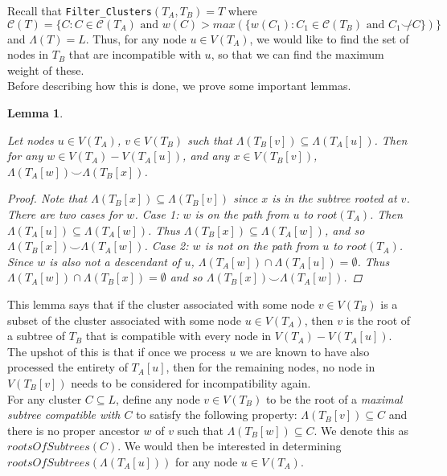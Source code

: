 \documentclass{article}
\newcommand{\compatible}{\smile}
\newcommand{\leafset}{\Lambda}
\newtheorem{filterclusterssubsetcompatible}[incompatibility]{Lemma}
\begin{document}
    Recall that \texttt{Filter\_Clusters}$(T_A, T_B) = T$ where $\mathcal{C}(T) = \{C : C \in \mathcal{C}(T_A) \text{ and } w(C) > max(\{w(C_1) : C_1 \in \mathcal{C}(T_B) \text{ and } C_1 \not\compatible C\})\}$ and $\leafset(T) = L$. Thus, for any node $u \in V(T_A)$, we would like to find the set of nodes in $T_B$ that are incompatible with $u$, so that we can find the maximum weight of these.\\

    Before describing how this is done, we prove some important lemmas.

    \begin{filterclusterssubsetcompatible}
        \label{lem:filterclusterssubsetcompatible}

        Let nodes $u \in V(T_A)$, $v \in V(T_B)$ such that $\leafset(T_B[v]) \subseteq \leafset(T_A[u])$. Then for any $w \in V(T_A) - V(T_A[u])$, and any $x \in V(T_B[v])$, $\leafset(T_A[w]) \compatible \leafset(T_B[x])$.

        \begin{proof}
            Note that $\leafset(T_B[x]) \subseteq \leafset(T_B[v])$ since $x$ is in the subtree rooted at $v$. There are two cases for $w$. Case 1: $w$ is on the path from $u$ to $root(T_A)$. Then $\leafset(T_A[u]) \subseteq \leafset(T_A[w])$. Thus $\leafset(T_B[x]) \subseteq \leafset(T_A[w])$, and so $\leafset(T_B[x]) \compatible \leafset(T_A[w])$. Case 2: $w$ is not on the path from $u$ to $root(T_A)$. Since $w$ is also not a descendant of $u$, $\leafset(T_A[w]) \cap \leafset(T_A[u]) = \emptyset$. Thus $\leafset(T_A[w]) \cap \leafset(T_B[x]) = \emptyset$ and so $\leafset(T_B[x]) \compatible \leafset(T_A[w])$.
        \end{proof}
    \end{filterclusterssubsetcompatible}

    This lemma says that if the cluster associated with some node $v \in V(T_B)$ is a subset of the cluster associated with some node $u \in V(T_A)$, then $v$ is the root of a subtree of $T_B$ that is compatible with every node in $V(T_A) - V(T_A[u])$. The upshot of this is that if once we process $u$ we are known to have also processed the entirety of $T_A[u]$, then for the remaining nodes, no node in $V(T_B[v])$ needs to be considered for incompatibility again.\\

    For any cluster $C \subseteq L$, define any node $v \in V(T_B)$ to be the root of a \textit{maximal subtree compatible with $C$} to satisfy the following property: $\leafset(T_B[v]) \subseteq C$ and there is no proper ancestor $w$ of $v$ such that $\leafset(T_B[w]) \subseteq C$. We denote this as $rootsOfSubtrees(C)$. We would then be interested in determining $rootsOfSubtrees(\leafset(T_A[u]))$ for any node $u \in V(T_A)$.\\
\end{document}
